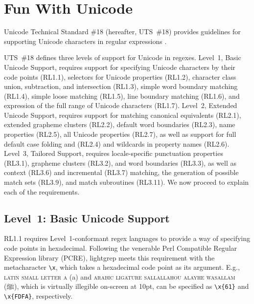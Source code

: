\documentclass[5p,final,number,sort&compress]{elsarticle}
\newcommand{\re}[1]{\texttt{#1}}
\newcommand*{\whack}{\textbackslash}
\begin{document}
\section{Fun With Unicode}

Unicode Technical Standard \#18 (hereafter, UTS~\#18) provides guidelines for supporting Unicode characters in regular expressions \citep{uts18}.


UTS~\#18 defines three levels of support for Unicode in regexes. Level~1, Basic Unicode Support, requires support for specifying Unicode characters by their code points (RL1.1), selectors for Unicode properties (RL1.2), character class union, subtraction, and intersection (RL1.3), simple word boundary matching (RL1.4), simple loose matching (RL1.5), line boundary matching (RL1.6), and expression of the full range of Unicode characters (RL1.7). Level~2, Extended Unicode Support, requires support for matching canonical equivalents (RL2.1), extended grapheme clusters (RL2.2), default word boundaries (RL2.3), name properties (RL2.5), all Unicode properties (RL2.7), as well as support for full default case folding and (RL2.4) and wildcards in property names (RL2.6). Level~3, Tailored Support, requires locale-specific punctuation properties (RL3.1), grapheme clusters (RL3.2), and word boundaries (RL3.3), as well as context (RL3.6) and incremental (RL3.7) matching, the generation of possible match sets (RL3.9), and match subroutines (RL3.11). We now proceed to explain each of the requirements.

\subsection{Level~1: Basic Unicode Support}

RL1.1 requires Level~1-conformant regex languages to provide a way of specifying code points in hexadecimal. Following the venerable Perl Compatible Regular Expression library (PCRE), lightgrep meets this requirement with the metacharacter \re{\whack x}, which takes a hexadecimal code point as its argument. E.g., \textsc{latin small letter a} (a) and \textsc{arabic ligature sallallahou alayhe wasallam} ({ﷺ}), which is virtually illegible on-screen at 10pt, can be specified as \re{\whack x\{61\}} and \re{\whack x\{FDFA\}}, respectively.
\end{document}
